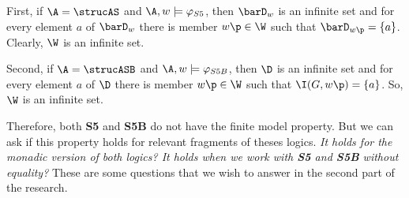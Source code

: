 \quad First, if $\A = \strucAS$ and $\A,w \models \varphi_{S5}$, then $\barD_{w}$ is an infinite set and for every element $a$ of $\barD_{w}$ there is member $w\p \in \W$ such that $\barD_{w\p}= \{a\}$. Clearly, $\W$ is an infinite set.

\quad Second, if $\A = \strucASB$ and $\A,w \models \varphi_{S5B}$, then $\D$ is an infinite set and for every element $a$ of $\D$ there is member $w\p \in \W$ such that $\I(G,w\p) = \{a\}$. So, $\W$ is an infinite set.

\quad Therefore, both \textbf{S5} and \textbf{S5B} do not have the finite model property. But we can ask if this property holds for relevant fragments of theses logics. \textit{It holds for the monadic version of both logics? It holds when we work with \textbf{S5} and \textbf{S5B} without equality?} These are some questions that we wish to answer in the second part of the research. 










